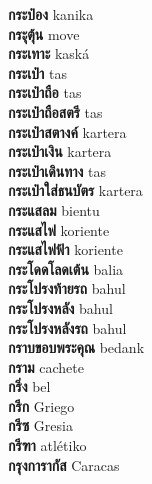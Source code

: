 \textbf{ กระป๋อง  } kanika \\
\textbf{ กระุตุ้น  } move \\
\textbf{ กระเทาะ  } kaská \\
\textbf{ กระเป๋า  } tas \\
\textbf{ กระเป๋าถือ  } tas \\
\textbf{ กระเป๋าถือสตรี  } tas \\
\textbf{ กระเป๋าสตางค์  } kartera \\
\textbf{ กระเป๋าเงิน  } kartera \\
\textbf{ กระเป๋าเดินทาง  } tas \\
\textbf{ กระเป๋าใส่ธนบัตร  } kartera \\
\textbf{ กระแสลม  } bientu \\
\textbf{ กระแสไฟ  } koriente \\
\textbf{ กระแสไฟฟ้า  } koriente \\
\textbf{ กระโดดโลดเต้น  } balia \\
\textbf{ กระโปรงท้ายรถ  } bahul \\
\textbf{ กระโปรงหลัง  } bahul \\
\textbf{ กระโปรงหลังรถ  } bahul \\
\textbf{ กราบขอบพระคุณ  } bedank \\
\textbf{ กราม  } cachete \\
\textbf{ กริ่ง  } bel \\
\textbf{ กรีก  } Griego \\
\textbf{ กรีซ  } Gresia \\
\textbf{ กรีฑา  } atlétiko \\
\textbf{ กรุงการากัส  } Caracas \\
